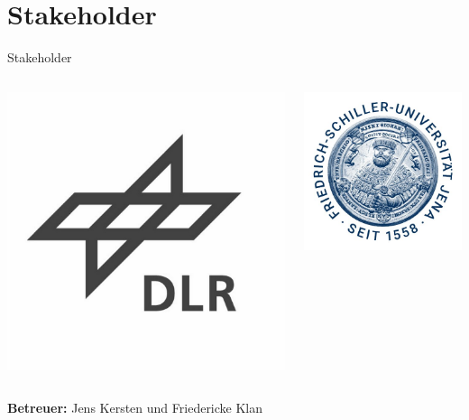 \documentclass[12pt, xcolor={usenames,dvipsnames,svgnames,x11names,table}]{beamer}
\begin{document}
	
	\section{Stakeholder}
	\begin{frame}{Stakeholder}{}
		\begin{columns}
			\begin{column}{.5\textwidth}
				\center \includegraphics[width=.9\textwidth]{dlr}
			\end{column}
			\begin{column}{.5\textwidth}
				\center \includegraphics[width=.8\textwidth]{fsu}
			\end{column}
		\end{columns}\bigskip
		\textbf{Betreuer:} Jens Kersten und Friedericke Klan
	\end{frame}
	
\end{document}
